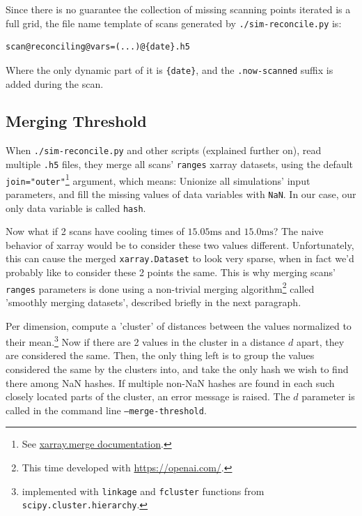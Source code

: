 Since there is no guarantee the collection of missing scanning points iterated is a full grid, the file name template of scans generated by \texttt{./sim-reconcile.py} is:

\begin{verbatim}
scan@reconciling@vars=(...)@{date}.h5
\end{verbatim}

Where the only dynamic part of it is \texttt{\{date\}}, and the \texttt{.now-scanned} suffix is added during the scan.

\subsection{Merging Threshold}\label{ssec:manual/merge-threshold}

When \texttt{./sim-reconcile.py} and other scripts (explained further on), read multiple \texttt{.h5} files, they merge all scans' \texttt{ranges} xarray datasets, using the default \texttt{join="outer"}\footnote{See \href{https://docs.xarray.dev/en/stable/generated/xarray.merge.html}{xarray.merge documentation}.} argument, which means: Unionize all simulations' input parameters, and fill the missing values of data variables with \texttt{NaN}. In our case, our only data variable is called \texttt{hash}.

Now what if 2 scans have cooling times of $15.05\mathrm{ms}$ and $15.0\mathrm{ms}$? The naive behavior of xarray would be to consider these two values different. Unfortunately, this can cause the merged \texttt{xarray.Dataset} to look very sparse, when in fact we'd probably like to consider these 2 points the same. This is why merging scans' \texttt{ranges} parameters is done using a non-trivial merging algorithm\footnote{This time developed with \url{https://openai.com/}.} called 'smoothly merging datasets', described briefly in the next paragraph.

Per dimension, compute a 'cluster' of distances between the values normalized to their mean.\footnote{implemented with \texttt{linkage} and \texttt{fcluster} functions from \texttt{scipy.cluster.hierarchy}.} Now if there are 2 values in the cluster in a distance $d$ apart, they are considered the same. Then, the only thing left is to group the values considered the same by the clusters into, and take the only hash we wish to find there among NaN hashes. If multiple non-NaN hashes are found in each such closely located parts of the cluster, an error message is raised. The $d$ parameter is called in the command line \texttt{--merge-threshold}.


